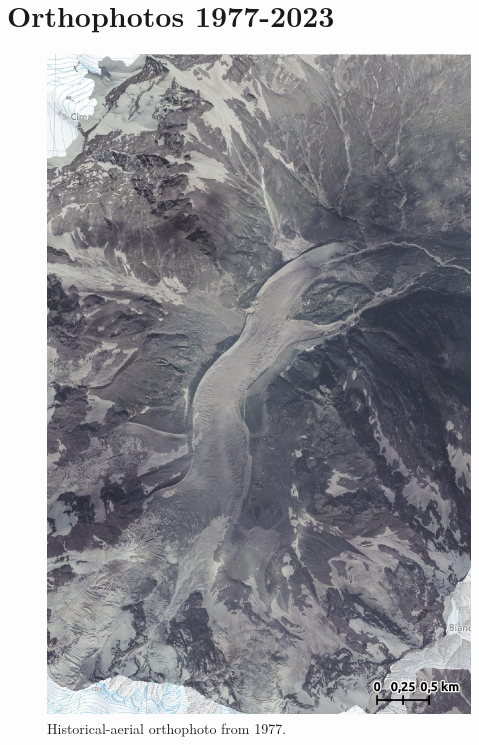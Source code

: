 \chapter{Orthophotos 1977-2023}\label{app:orthophotos}

\begin{figure}[p]
    \centering
    \includegraphics[height=\textheight]{figures/appendix/orto_1977.jpg}
    \caption{Historical-aerial orthophoto from 1977.}
\end{figure}

